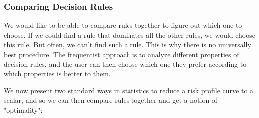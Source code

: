 \documentclass[12pt]{report}
\renewcommand{\emph}[1]{\color{violet}#1\color{black}{}}
\begin{document}
\subsubsection{Comparing Decision Rules}
We would like to be able to compare rules together to figure out which one to choose. If we could find a rule that dominates all the other rules, we would choose this rule. But often, we can't find such a rule. \emph{This is why there is no universally best procedure.} The frequentist approach is to analyze different properties of decision rules, and the user can then choose which one they prefer according to which properties is better to them.

We now present two standard ways in statistics to reduce a risk profile curve to a scalar, and so we can then compare rules together and get a notion of "optimality":
\end{document}
